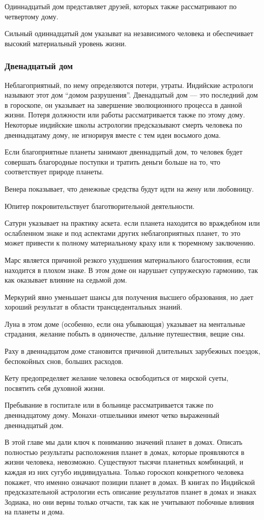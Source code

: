 Одиннадцатый дом представляет друзей, которых также рассматривают по четвертому дому.

Сильный одиннадцатый дом указыват на независимого человека и обеспечивает высокий материальный уровень жизни.

\subsubsection*{Двенадцатый дом}

Неблагоприятный, по нему определяются потери, утраты. Индийские астрологи называют этот дом ``домом разрушения''. Двенадцатый дом --- это последний дом в гороскопе, он указывает на завершение эволюционного процесса в данной жизни. Потеря должности или работы рассматривается также по этому дому. Некоторые индийские школы астрологии предсказывают смерть человека по двеннадцатаму дому, не игнорируя вместе с тем идеи восьмого дома.

Если благоприятные планеты занимают двеннадцатый дом, то человек будет совершать благородные поступки и тратить деньги больше на то,  что соответствует природе планеты.

Венера показывает, что денежные средства будут идти на жену или любовницу.

Юпитер покровительствует благотворительной деятельности.

Сатурн указывает на практику аскета. если планета находится во враждебном или ослабленном знаке и под аспектами других неблагоприятных планет, то это может привести к полному материальному краху или к тюремному заключению.

Марс является причиной резкого ухудшения материального благостояния, если находится в плохом знаке. В этом доме он нарушает супружескую гармонию, так как оказывает влияние на седьмой дом.

Меркурий явно уменьшает шансы для получения высшего образования, но дает хороший результат в области трансцедентальных знаний.

Луна в этом доме (особенно, если она убывающая) указывает на ментальные страдания, желание побыть в одиночестве, дальние путешествия, вещие сны.

Раху в двеннадцатом доме становится причиной длительных зарубежных поездок, беспокойных снов, больших расходов.

Кету предопределяет желание человека освободиться от мирской суеты, посвятить себя духовной жизни.

Пребывание в госпитале или в больнице рассматривается также по двеннадцатому дому. Монахи--отшельники имеют четко выраженный двеннадцатый дом.

В этой главе мы дали ключ к пониманию значений планет в домах. Описать полностью результаты расположения планет в домах, которые проявляются в жизни человека, невозможно. Существуют тысячи планетных комбинаций, и каждая из них сугубо индивидуальна. Только гороскоп конкретного человека покажет, что именно означают позиции планет в домах. В книгах по Индийской предсказательной астрологии есть описание результатов планет в домах и знаках Зодиака, но они верны только отчасти, так как не учитывают побочные влияния на планеты и дома.

